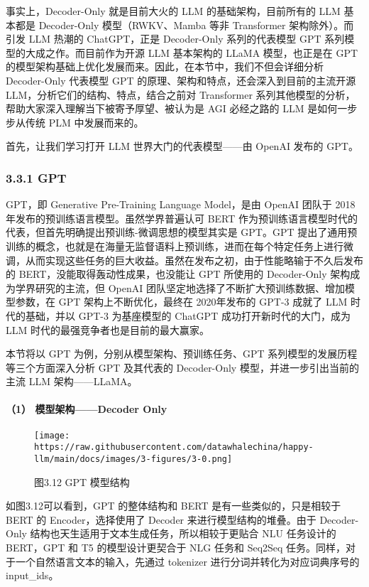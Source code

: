 \documentclass[
]{article}
\begin{document}
事实上，Decoder-Only 就是目前大火的 LLM 的基础架构，目前所有的 LLM
基本都是 Decoder-Only 模型（RWKV、Mamba 等非 Transformer
架构除外）。而引发 LLM 热潮的 ChatGPT，正是 Decoder-Only 系列的代表模型
GPT 系列模型的大成之作。而目前作为开源 LLM 基本架构的 LLaMA
模型，也正是在 GPT
的模型架构基础上优化发展而来。因此，在本节中，我们不但会详细分析
Decoder-Only 代表模型 GPT 的原理、架构和特点，还会深入到目前的主流开源
LLM，分析它们的结构、特点，结合之前对 Transformer
系列其他模型的分析，帮助大家深入理解当下被寄予厚望、被认为是 AGI
必经之路的 LLM 是如何一步步从传统 PLM 中发展而来的。

首先，让我们学习打开 LLM 世界大门的代表模型------由 OpenAI 发布的 GPT。

\subsubsection{3.3.1 GPT}\label{gpt}

GPT，即 Generative Pre-Training Language Model，是由 OpenAI 团队于
2018年发布的预训练语言模型。虽然学界普遍认可 BERT
作为预训练语言模型时代的代表，但首先明确提出预训练-微调思想的模型其实是
GPT。GPT
提出了通用预训练的概念，也就是在海量无监督语料上预训练，进而在每个特定任务上进行微调，从而实现这些任务的巨大收益。虽然在发布之初，由于性能略输于不久后发布的
BERT，没能取得轰动性成果，也没能让 GPT 所使用的 Decoder-Only
架构成为学界研究的主流，但 OpenAI
团队坚定地选择了不断扩大预训练数据、增加模型参数，在 GPT
架构上不断优化，最终在 2020年发布的 GPT-3 成就了 LLM 时代的基础，并以
GPT-3 为基座模型的 ChatGPT 成功打开新时代的大门，成为 LLM
时代的最强竞争者也是目前的最大赢家。

本节将以 GPT 为例，分别从模型架构、预训练任务、GPT
系列模型的发展历程等三个方面深入分析 GPT 及其代表的 Decoder-Only
模型，并进一步引出当前的主流 LLM 架构------LLaMA。

\paragraph{（1） 模型架构------Decoder
Only}\label{ux6a21ux578bux67b6ux6784decoder-only}

\begin{figure}[htbp]\centering
\texttt{[image: https://raw.githubusercontent.com/datawhalechina/happy-llm/main/docs/images/3-figures/3-0.png]}
\caption{图3.12 GPT 模型结构}
\end{figure}

如图3.12可以看到，GPT 的整体结构和 BERT 是有一些类似的，只是相较于 BERT
的 Encoder，选择使用了 Decoder 来进行模型结构的堆叠。由于 Decoder-Only
结构也天生适用于文本生成任务，所以相较于更贴合 NLU 任务设计的 BERT，GPT
和 T5 的模型设计更契合于 NLG 任务和 Seq2Seq
任务。同样，对于一个自然语言文本的输入，先通过 tokenizer
进行分词并转化为对应词典序号的 input\_ids。
\end{document}
